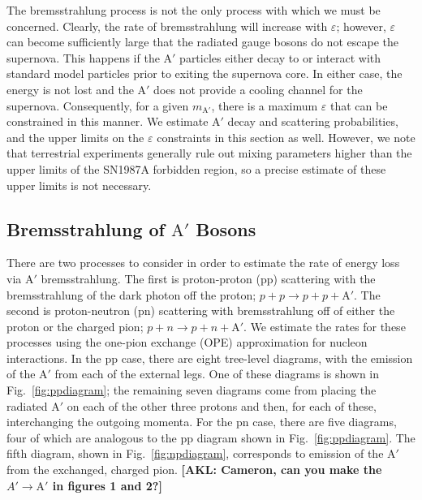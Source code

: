 \documentclass[nofootinbib,prd,superscriptaddress,twocolumn]{revtex4}
\newcommand{\Aprime}{\mathrm{A}'}
\newcommand{\akl}[1]{{{\bf{\color{Blue}[AKL: #1]}}}}
\begin{document}
The bremsstrahlung process is not the only process with which we must be concerned. Clearly, the rate of 
bremsstrahlung will increase with $\varepsilon$; however, $\varepsilon$ can become sufficiently large 
that the radiated gauge bosons do not escape the supernova. This happens if the $\Aprime$ particles 
either decay to or interact with standard model particles prior to exiting the supernova core. 
In either case, the energy is not lost and the $\Aprime$ does not provide a cooling channel for the supernova. 
Consequently, for a given $m_{\Aprime}$, there is a maximum $\varepsilon$ that can be constrained in this 
manner. We estimate $\Aprime$ decay and scattering probabilities, and the upper limits on the $\varepsilon$ 
constraints in this section as well. However, we note that terrestrial experiments generally rule out 
mixing parameters higher than the upper limits of the SN1987A forbidden region, so a precise estimate 
of these upper limits is not necessary.

\subsection{Bremsstrahlung of $\Aprime$ Bosons}

There are two processes to consider in order to estimate the rate of energy loss via $\Aprime$ bremsstrahlung. The first is  
proton-proton (pp) scattering with the bremsstrahlung of the dark photon off the proton; $p+p \rightarrow p+p+\Aprime$. 
The second is proton-neutron (pn) scattering with bremsstrahlung off of either the proton or the charged pion; 
$p+n \rightarrow p+n+\Aprime$. We estimate the rates for these processes using the one-pion exchange (OPE) 
approximation for nucleon interactions. In the pp case, there are eight tree-level diagrams, 
with the emission of the $\Aprime$ from each of the external legs. One of these diagrams is shown 
in Fig.~\ref{fig:ppdiagram}; the remaining seven diagrams come from placing the radiated $\Aprime$ 
on each of the other three protons and then, for each of these, interchanging the outgoing momenta. 
For the pn case, there are five diagrams, four of which are analogous to the pp diagram shown in 
Fig.~\ref{fig:ppdiagram}. The fifth diagram, shown in Fig.~\ref{fig:npdiagram}, corresponds to 
emission of the $\Aprime$ from the exchanged, charged pion. \akl{Cameron, can you make the $A' \to \mathrm{A'}$ in figures 1 and 2?}
\end{document}
